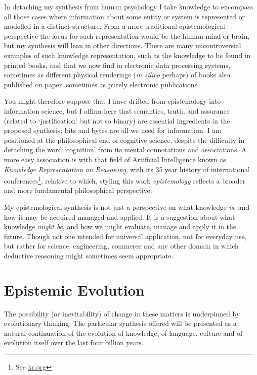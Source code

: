 \documentclass[10pt,titlepage]{book}
\begin{document}
In detaching my synthesis from human psychology I take knowledge to encompass all those cases where information about some entity or system is represented or modelled in a distinct structure.
From a more traditional epistemological perspective the locus for such representation would be the human mind or brain, but my synthesis will lean in other directions.
There are many uncontroversial examples of such knowledge representation, such as the knowledge to be found in printed books, and that we now find in electronic data processing systems, sometimes as different physical renderings (\emph{in silico} perhaps) of books also published on paper, sometimes as purely electronic publications.

You might therefore suppose that I have drifted from epistemology into information science, but I affirm here that semantics, truth, and assurance (related to `justification' but not so binary) are essential ingredients in the proposed synthesis; bits and bytes are all we need for information.
I am positioned at the philosophical end of cognitive science, despite the difficulty in detaching the word `cognition' from its mental connotations and associations.
A more easy association is with that field of Artificial Intelligence known as \emph{Knowledge Representation an Reasoning}, with its 35 year history of international conferences\footnote{See \href{http://kr.org/}{kr.org}}, relative to which, styling this work \emph{epistemology} reflects a broader and more fundamental philosophical perspective.

My epistemological synthesis is not just a perspective on what knowledge \emph{is}, and how it may be acquired managed and applied.
It is a suggestion about what knowledge \emph{might be}, and how we might evaluate, manage and apply it in the future.
Though not one intended for universal application, not for everyday use, but rather for science, engineering, commerce and any other domain in which deductive reasoning might sometimes seem appropriate.

\section{Epistemic Evolution}

The possibility (or inevitability) of change in these matters is underpinned by evolutionary thinking.
The particular synthesis offered will be presented as a natural continuation of the evolution of knowledge, of language, culture and of evolution itself over the last four billion years.
\end{document}
